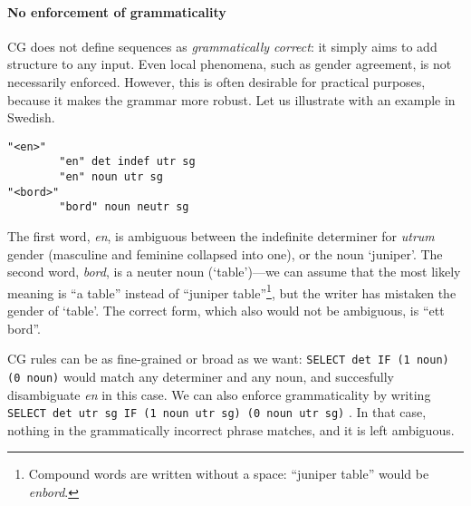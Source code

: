 { 
\paragraph{No enforcement of grammaticality} 




CG does not define sequences as \emph{grammatically correct}: it simply aims to add structure to any input.
Even local phenomena, such as gender agreement, is not necessarily enforced.
However, this is often desirable for practical purposes, because it makes the grammar more robust.
Let us illustrate with an example in Swedish.

\begin{verbatim}
"<en>"
        "en" det indef utr sg
        "en" noun utr sg 
"<bord>"
        "bord" noun neutr sg
\end{verbatim}

The first word, \emph{en}, is ambiguous between the indefinite determiner for
\emph{utrum} gender  (masculine and feminine collapsed into one), or the noun `juniper'.
The second word, \emph{bord}, is a neuter noun (`table')---we can assume that the
most likely meaning is ``a table'' instead of ``juniper table''\footnote{Compound words are written without a space: ``juniper table'' would be \emph{enbord}.}, but the writer has mistaken the gender of `table'. The correct form, which also would not be ambiguous, is ``ett bord''.

CG rules can be as fine-grained or broad as we want: 
\texttt{SELECT det IF (1 noun) (0 noun)} would match any determiner and any noun, 
and succesfully disambiguate \emph{en} in this case. 
We can also enforce grammaticality by writing \texttt{SELECT det utr sg IF (1 noun utr sg) (0 noun utr sg)}%
. In that case, nothing in the grammatically incorrect phrase matches, and it is left ambiguous.


}
